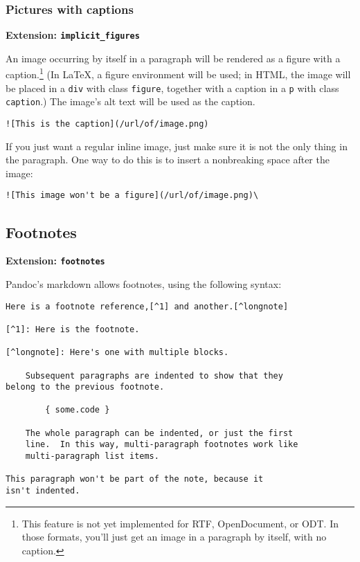 \documentclass[]{article}
\begin{document}
\subsubsection{Pictures with captions}

\textbf{Extension: \texttt{implicit\_figures}}

An image occurring by itself in a paragraph will be rendered as a figure
with a caption.\footnote{This feature is not yet implemented for RTF,
  OpenDocument, or ODT. In those formats, you'll just get an image in a
  paragraph by itself, with no caption.} (In LaTeX, a figure environment
will be used; in HTML, the image will be placed in a \texttt{div} with
class \texttt{figure}, together with a caption in a \texttt{p} with
class \texttt{caption}.) The image's alt text will be used as the
caption.

\begin{verbatim}
![This is the caption](/url/of/image.png)
\end{verbatim}

If you just want a regular inline image, just make sure it is not the
only thing in the paragraph. One way to do this is to insert a
nonbreaking space after the image:

\begin{verbatim}
![This image won't be a figure](/url/of/image.png)\
\end{verbatim}

\subsection{Footnotes}

\textbf{Extension: \texttt{footnotes}}

Pandoc's markdown allows footnotes, using the following syntax:

\begin{verbatim}
Here is a footnote reference,[^1] and another.[^longnote]

[^1]: Here is the footnote.

[^longnote]: Here's one with multiple blocks.

    Subsequent paragraphs are indented to show that they
belong to the previous footnote.

        { some.code }

    The whole paragraph can be indented, or just the first
    line.  In this way, multi-paragraph footnotes work like
    multi-paragraph list items.

This paragraph won't be part of the note, because it
isn't indented.
\end{verbatim}
\end{document}
